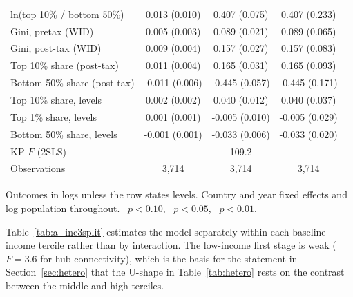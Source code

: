 \begin{table}[H]
\begin{threeparttable}
\begin{tabular}{lccc}
ln(top 10\% / bottom 50\%) & 0.013 (0.010) & 0.407\sym{***} (0.075) & 0.407\sym{*} (0.233) \\
Gini, pretax (WID) & 0.005 (0.003) & 0.089\sym{***} (0.021) & 0.089 (0.065) \\
Gini, post-tax (WID) & 0.009\sym{**} (0.004) & 0.157\sym{***} (0.027) & 0.157\sym{*} (0.083) \\
Top 10\% share (post-tax) & 0.011\sym{***} (0.004) & 0.165\sym{***} (0.031) & 0.165\sym{*} (0.093) \\
Bottom 50\% share (post-tax) & -0.011\sym{*} (0.006) & -0.445\sym{***} (0.057) & -0.445\sym{***} (0.171) \\
Top 10\% share, levels & 0.002 (0.002) & 0.040\sym{***} (0.012) & 0.040 (0.037) \\
Top 1\% share, levels & 0.001 (0.001) & -0.005 (0.010) & -0.005 (0.029) \\
Bottom 50\% share, levels & -0.001 (0.001) & -0.033\sym{***} (0.006) & -0.033\sym{*} (0.020) \\
KP $F$ (2SLS) & & 109.2 & \\
\midrule
Observations & 3,714 & 3,714 & 3,714 \\
\bottomrule
\end{tabular}
\begin{tablenotes}\footnotesize\item Outcomes in logs unless the row states levels. Country and year fixed effects and log population throughout. \sym{*}~$p<0.10$, \sym{**}~$p<0.05$, \sym{***}~$p<0.01$.\end{tablenotes}\end{threeparttable}\end{table}

Table~\ref{tab:a_inc3split} estimates the model separately within each baseline income tercile rather than by interaction. The low-income first stage is weak ($F=3.6$ for hub connectivity), which is the basis for the statement in Section~\ref{sec:hetero} that the U-shape in Table~\ref{tab:hetero} rests on the contrast between the middle and high terciles.

